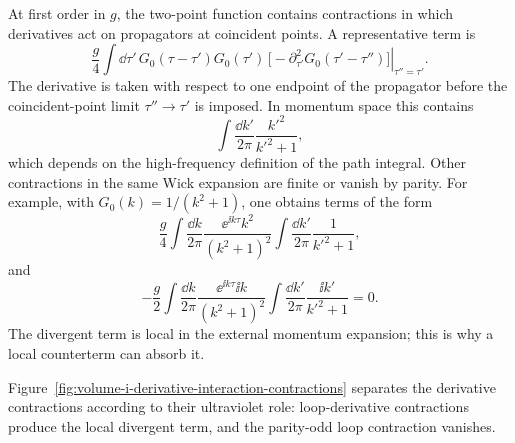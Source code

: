 At first order in \(g\), the two-point function contains contractions in
which derivatives act on propagators at coincident points. A representative
term is
\[
  \frac{g}{4}\int\dd\tau'\,
  G_0(\tau-\tau')G_0(\tau')\,
  \left.
    \bigl[-\partial_{\tau'}^2G_0(\tau'-\tau'')\bigr]
  \right|_{\tau''=\tau'} .
\]
The derivative is taken with respect to one endpoint of the propagator before
the coincident-point limit \(\tau''\to\tau'\) is imposed.
In momentum space this contains
\[
  \int\frac{\dd k'}{2\pi}\frac{k'^2}{k'^2+1},
\]
which depends on the high-frequency definition of the path integral.
Other contractions in the same Wick expansion are finite or vanish by parity.
For example, with \(G_0(k)=1/(k^2+1)\), one obtains terms of the form
\[
  \frac{g}{4}
  \int\frac{\dd k}{2\pi}
    \frac{\ee^{\ii k\tau}k^2}{(k^2+1)^2}
  \int\frac{\dd k'}{2\pi}\frac{1}{k'^2+1},
\]
and
\[
  -\frac{g}{2}
  \int\frac{\dd k}{2\pi}
    \frac{\ee^{\ii k\tau}\ii k}{(k^2+1)^2}
  \int\frac{\dd k'}{2\pi}\frac{\ii k'}{k'^2+1}=0.
\]
The divergent term is local in the external momentum expansion; this is why a
local counterterm can absorb it.

Figure~\ref{fig:volume-i-derivative-interaction-contractions} separates the
derivative contractions according to their ultraviolet role: loop-derivative
contractions produce the local divergent term, and the parity-odd loop
contraction vanishes.

